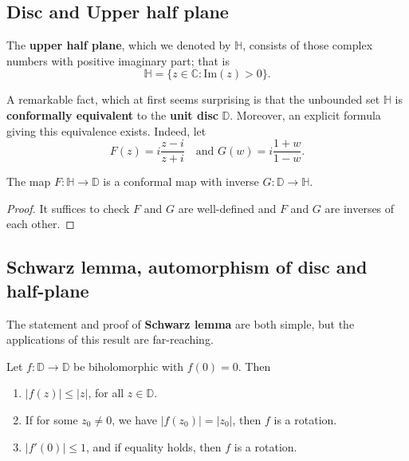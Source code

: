 \documentclass{article}
\begin{document}
\subsection*{Disc and Upper half plane}

The \textbf{upper half plane}, which we denoted by $\mathbb{H}$, consists of those complex numbers with positive imaginary part; that is
$$\mathbb{H} = \{z \in \mathbb{C} : \text{Im}(z) > 0\}.$$

A remarkable fact, which at first seems surprising is that the unbounded set $\mathbb{H}$ is \textbf{conformally equivalent} to the \textbf{unit disc} $\mathbb{D}$. Moreover, an explicit formula giving this equivalence exists. Indeed, let
$$F(z) = i \frac{z-i}{z+i} \quad \text{and } G(w) = i \frac{1+w}{1-w}.$$

\begin{theorem}
The map $F: \mathbb{H} \to \mathbb{D}$ is a conformal map with inverse $G: \mathbb{D} \to \mathbb{H}$.
\end{theorem}

\begin{proof}
It suffices to check $F$ and $G$ are well-defined and $F$ and $G$ are inverses of each other.
\end{proof}

\subsection*{Schwarz lemma, automorphism of disc and half-plane}

The statement and proof of \textbf{Schwarz lemma} are both simple, but the applications of this result are far-reaching.

\begin{lemma}
Let $f: \mathbb{D} \to \mathbb{D}$ be biholomorphic with $f(0)=0$. Then
\begin{enumerate}
    \item $|f(z)| \le |z|$, for all $z \in \mathbb{D}$.
    \item If for some $z_0 \ne 0$, we have $|f(z_0)| = |z_0|$, then $f$ is a rotation.
    \item $|f'(0)| \le 1$, and if equality holds, then $f$ is a rotation.
\end{enumerate}
\end{lemma}
\end{document}
